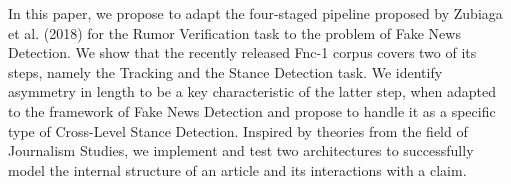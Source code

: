 In this paper, we propose to adapt the four-staged pipeline proposed by Zubiaga et al. (2018) for the Rumor Verification task to the problem of Fake News Detection. We show that the recently released Fnc-1 corpus covers two of its steps, namely the Tracking and the Stance Detection task. We identify asymmetry in length to be a key characteristic of the latter step, when adapted to the framework of Fake News Detection and propose to handle it as a specific type of Cross-Level Stance Detection. Inspired by theories from the field of Journalism Studies, we implement and test two architectures to successfully model the internal structure of an article and its interactions with a claim.
